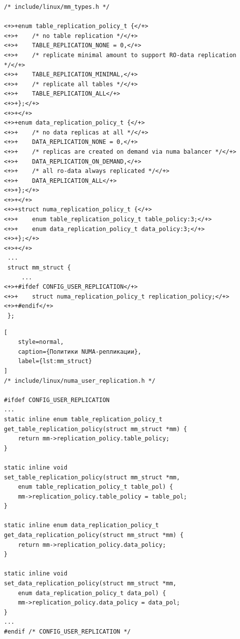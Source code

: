 
\begin{lstlisting}[style=diff]
 /* include/linux/mm_types.h */

<+>+enum table_replication_policy_t {</+>
<+>+	/* no table replication */</+>
<+>+	TABLE_REPLICATION_NONE = 0,</+>
<+>+	/* replicate minimal amount to support RO-data replication */</+>
<+>+	TABLE_REPLICATION_MINIMAL,</+>
<+>+	/* replicate all tables */</+>
<+>+	TABLE_REPLICATION_ALL</+>
<+>+};</+>
<+>+</+>
<+>+enum data_replication_policy_t {</+>
<+>+	/* no data replicas at all */</+>
<+>+	DATA_REPLICATION_NONE = 0,</+>
<+>+	/* replicas are created on demand via numa balancer */</+>
<+>+	DATA_REPLICATION_ON_DEMAND,</+>
<+>+	/* all ro-data always replicated */</+>
<+>+	DATA_REPLICATION_ALL</+>
<+>+};</+>
<+>+</+>
<+>+struct numa_replication_policy_t {</+>
<+>+	enum table_replication_policy_t table_policy:3;</+>
<+>+	enum data_replication_policy_t data_policy:3;</+>
<+>+};</+>
<+>+</+>
 ...
 struct mm_struct {
     ...
<+>+#ifdef CONFIG_USER_REPLICATION</+>
<+>+    struct numa_replication_policy_t replication_policy;</+>
<+>+#endif</+>
 };
\end{lstlisting}
\begin{lstlisting}[
    style=normal,
    caption={Политики NUMA-репликации},
    label={lst:mm_struct}
]
/* include/linux/numa_user_replication.h */

#ifdef CONFIG_USER_REPLICATION
...
static inline enum table_replication_policy_t
get_table_replication_policy(struct mm_struct *mm) {
	return mm->replication_policy.table_policy;
}

static inline void
set_table_replication_policy(struct mm_struct *mm,
	enum table_replication_policy_t table_pol) {
	mm->replication_policy.table_policy = table_pol;
}

static inline enum data_replication_policy_t
get_data_replication_policy(struct mm_struct *mm) {
	return mm->replication_policy.data_policy;
}

static inline void
set_data_replication_policy(struct mm_struct *mm,
	enum data_replication_policy_t data_pol) {
	mm->replication_policy.data_policy = data_pol;
}
...
#endif /* CONFIG_USER_REPLICATION */
\end{lstlisting}
\vspace{0.5cm}


